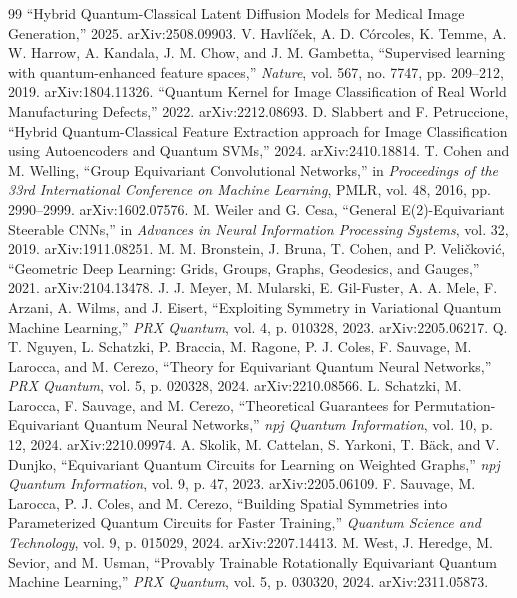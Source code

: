 \documentclass[11pt]{article}
\begin{document}
\begin{thebibliography}{99}
 ``Hybrid Quantum-Classical Latent Diffusion Models for Medical Image Generation,'' 2025. arXiv:2508.09903.
 V. Havl{\'i}{\v c}ek, A. D. C{\'o}rcoles, K. Temme, A. W. Harrow, A. Kandala, J. M. Chow, and J. M. Gambetta, ``Supervised learning with quantum-enhanced feature spaces,'' \textit{Nature}, vol. 567, no. 7747, pp. 209--212, 2019. arXiv:1804.11326.
 ``Quantum Kernel for Image Classification of Real World Manufacturing Defects,'' 2022. arXiv:2212.08693.
 D. Slabbert and F. Petruccione, ``Hybrid Quantum-Classical Feature Extraction approach for Image Classification using Autoencoders and Quantum SVMs,'' 2024. arXiv:2410.18814.
 T. Cohen and M. Welling, ``Group Equivariant Convolutional Networks,'' in \textit{Proceedings of the 33rd International Conference on Machine Learning}, PMLR, vol. 48, 2016, pp. 2990--2999. arXiv:1602.07576.
 M. Weiler and G. Cesa, ``General E(2)-Equivariant Steerable CNNs,'' in \textit{Advances in Neural Information Processing Systems}, vol. 32, 2019. arXiv:1911.08251.
 M. M. Bronstein, J. Bruna, T. Cohen, and P. Veli\v{c}kovi\'c, ``Geometric Deep Learning: Grids, Groups, Graphs, Geodesics, and Gauges,'' 2021. arXiv:2104.13478.
 J. J. Meyer, M. Mularski, E. Gil-Fuster, A. A. Mele, F. Arzani, A. Wilms, and J. Eisert, ``Exploiting Symmetry in Variational Quantum Machine Learning,'' \textit{PRX Quantum}, vol. 4, p. 010328, 2023. arXiv:2205.06217.
 Q. T. Nguyen, L. Schatzki, P. Braccia, M. Ragone, P. J. Coles, F. Sauvage, M. Larocca, and M. Cerezo, ``Theory for Equivariant Quantum Neural Networks,'' \textit{PRX Quantum}, vol. 5, p. 020328, 2024. arXiv:2210.08566.
 L. Schatzki, M. Larocca, F. Sauvage, and M. Cerezo, ``Theoretical Guarantees for Permutation-Equivariant Quantum Neural Networks,'' \textit{npj Quantum Information}, vol. 10, p. 12, 2024. arXiv:2210.09974.
 A. Skolik, M. Cattelan, S. Yarkoni, T. B\"ack, and V. Dunjko, ``Equivariant Quantum Circuits for Learning on Weighted Graphs,'' \textit{npj Quantum Information}, vol. 9, p. 47, 2023. arXiv:2205.06109.
 F. Sauvage, M. Larocca, P. J. Coles, and M. Cerezo, ``Building Spatial Symmetries into Parameterized Quantum Circuits for Faster Training,'' \textit{Quantum Science and Technology}, vol. 9, p. 015029, 2024. arXiv:2207.14413.
 M. West, J. Heredge, M. Sevior, and M. Usman, ``Provably Trainable Rotationally Equivariant Quantum Machine Learning,'' \textit{PRX Quantum}, vol. 5, p. 030320, 2024. arXiv:2311.05873.

\end{thebibliography}
\end{document}
